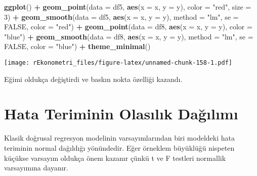 \documentclass[
]{book}
\newenvironment{Shaded}{\begin{snugshade}}{\end{snugshade}}
\newcommand{\DataTypeTok}[1]{\textcolor[rgb]{0.13,0.29,0.53}{#1}}
\newcommand{\DecValTok}[1]{\textcolor[rgb]{0.00,0.00,0.81}{#1}}
\newcommand{\KeywordTok}[1]{\textcolor[rgb]{0.13,0.29,0.53}{\textbf{#1}}}
\newcommand{\NormalTok}[1]{#1}
\newcommand{\OperatorTok}[1]{\textcolor[rgb]{0.81,0.36,0.00}{\textbf{#1}}}
\newcommand{\OtherTok}[1]{\textcolor[rgb]{0.56,0.35,0.01}{#1}}
\newcommand{\StringTok}[1]{\textcolor[rgb]{0.31,0.60,0.02}{#1}}
\begin{document}
\begin{Shaded}
\begin{Highlighting}[]
\KeywordTok{ggplot}\NormalTok{() }\OperatorTok{+}
\StringTok{  }\KeywordTok{geom_point}\NormalTok{(}\DataTypeTok{data =}\NormalTok{ df5, }\KeywordTok{aes}\NormalTok{(}\DataTypeTok{x =}\NormalTok{ x, }\DataTypeTok{y =}\NormalTok{ y), }\DataTypeTok{color =} \StringTok{"red"}\NormalTok{, }\DataTypeTok{size =} \DecValTok{3}\NormalTok{) }\OperatorTok{+}
\StringTok{  }\KeywordTok{geom_smooth}\NormalTok{(}\DataTypeTok{data =}\NormalTok{ df5, }\KeywordTok{aes}\NormalTok{(}\DataTypeTok{x =}\NormalTok{ x, }\DataTypeTok{y =}\NormalTok{ y), }\DataTypeTok{method =} \StringTok{"lm"}\NormalTok{, }\DataTypeTok{se =} \OtherTok{FALSE}\NormalTok{, }\DataTypeTok{color =} \StringTok{"red"}\NormalTok{) }\OperatorTok{+}
\StringTok{  }\KeywordTok{geom_point}\NormalTok{(}\DataTypeTok{data =}\NormalTok{ df8, }\KeywordTok{aes}\NormalTok{(}\DataTypeTok{x =}\NormalTok{ x, }\DataTypeTok{y =}\NormalTok{ y), }\DataTypeTok{color =} \StringTok{"blue"}\NormalTok{) }\OperatorTok{+}
\StringTok{  }\KeywordTok{geom_smooth}\NormalTok{(}\DataTypeTok{data =}\NormalTok{ df8, }\KeywordTok{aes}\NormalTok{(}\DataTypeTok{x =}\NormalTok{ x, }\DataTypeTok{y =}\NormalTok{ y), }\DataTypeTok{method =} \StringTok{"lm"}\NormalTok{, }\DataTypeTok{se =} \OtherTok{FALSE}\NormalTok{, }\DataTypeTok{color =} \StringTok{"blue"}\NormalTok{) }\OperatorTok{+}
\StringTok{  }\KeywordTok{theme_minimal}\NormalTok{()}
\end{Highlighting}
\end{Shaded}

\texttt{[image: rEkonometri\_files/figure-latex/unnamed-chunk-158-1.pdf]}

Eğimi oldukça değiştirdi ve baskın nokta özelliği kazandı.

\hypertarget{hata-teriminin-olasux131lux131k-daux11fux131lux131mux131}{%
\section{Hata Teriminin Olasılık Dağılımı}\label{hata-teriminin-olasux131lux131k-daux11fux131lux131mux131}}

Klasik doğrusal regresyon modelinin varsayımlarından biri modeldeki hata teriminin normal dağıldığı yönündedir. Eğer örneklem büyüklüğü nispeten küçükse varsayım oldukça önem kazanır çünkü t ve F testleri normallik varsayımına dayanır.
\end{document}
